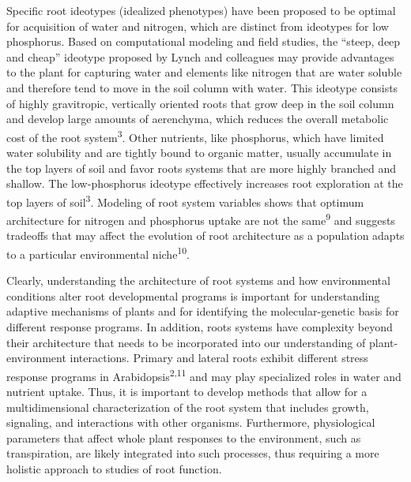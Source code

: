 \documentclass[]{article}
\begin{document}
Specific root ideotypes (idealized phenotypes) have been proposed to be
optimal for acquisition of water and nitrogen, which are distinct from
ideotypes for low phosphorus. Based on computational modeling and field
studies, the ``steep, deep and cheap'' ideotype proposed by Lynch and
colleagues may provide advantages to the plant for capturing water and
elements like nitrogen that are water soluble and therefore tend to move
in the soil column with water. This ideotype consists of highly
gravitropic, vertically oriented roots that grow deep in the soil column
and develop large amounts of aerenchyma, which reduces the overall
metabolic cost of the root system\textsuperscript{3}. Other nutrients,
like phosphorus, which have limited water solubility and are tightly
bound to organic matter, usually accumulate in the top layers of soil
and favor roots systems that are more highly branched and shallow. The
low-phosphorus ideotype effectively increases root exploration at the
top layers of soil\textsuperscript{3}. Modeling of root system variables
shows that optimum architecture for nitrogen and phosphorus uptake are
not the same\textsuperscript{9} and suggests tradeoffs that may affect
the evolution of root architecture as a population adapts to a
particular environmental niche\textsuperscript{10}.

Clearly, understanding the architecture of root systems and how
environmental conditions alter root developmental programs is important
for understanding adaptive mechanisms of plants and for identifying the
molecular-genetic basis for different response programs. In addition,
roots systems have complexity beyond their architecture that needs to be
incorporated into our understanding of plant-environment interactions.
Primary and lateral roots exhibit different stress response programs in
Arabidopsis\textsuperscript{2,11} and may play specialized roles in
water and nutrient uptake. Thus, it is important to develop methods that
allow for a multidimensional characterization of the root system that
includes growth, signaling, and interactions with other organisms.
Furthermore, physiological parameters that affect whole plant responses
to the environment, such as transpiration, are likely integrated into
such processes, thus requiring a more holistic approach to studies of
root function.
\end{document}
